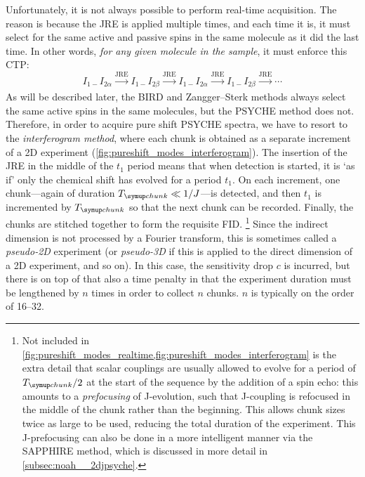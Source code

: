Unfortunately, it is not always possible to perform real-time acquisition.
The reason is because the JRE is applied multiple times, and each time it is, it must select for the same active and passive spins in the same molecule as it did the last time.
In other words, \textit{for any given molecule in the sample}, it must enforce this CTP:
\begin{equation}
    \label{eq:real_time_pureshift}
    I_{1-}I_{2\alpha} \xrightarrow[]{\text{JRE}} I_{1-}I_{2\beta} \xrightarrow[]{\text{JRE}} I_{1-}I_{2\alpha} \xrightarrow[]{\text{JRE}} I_{1-}I_{2\beta} \xrightarrow[]{\text{JRE}} \cdots
\end{equation}
As will be described later, the BIRD and Zangger--Sterk methods always select the same active spins in the same molecules, but the PSYCHE method does not.
Therefore, in order to acquire pure shift PSYCHE spectra, we have to resort to the \textit{interferogram method}, where each chunk is obtained as a separate increment of a 2D experiment (\cref{fig:pureshift_modes_interferogram}).
The insertion of the JRE in the middle of the $t_1$ period means that when detection is started, it is `as if' only the chemical shift has evolved for a period $t_1$.
On each increment, one chunk---again of duration $\Tchunk \ll 1/J$---is detected, and then $t_1$ is incremented by $\Tchunk$ so that the next chunk can be recorded.
Finally, the chunks are stitched together to form the requisite FID.%
\footnote{Not included in \cref{fig:pureshift_modes_realtime,fig:pureshift_modes_interferogram} is the extra detail that scalar couplings are usually allowed to evolve for a period of $\Tchunk/2$ at the start of the sequence by the addition of a spin echo: this amounts to a \textit{prefocusing} of J-evolution, such that J-coupling is refocused in the middle of the chunk rather than the beginning\autocite{Aguilar2010ACIE}.
This allows chunk sizes twice as large to be used, reducing the total duration of the experiment.
This J-prefocusing can also be done in a more intelligent manner via the SAPPHIRE method\autocite{Moutzouri2017CC}, which is discussed in more detail in \cref{subsec:noah__2djpsyche}.}
Since the indirect dimension is not processed by a Fourier transform, this is sometimes called a \textit{pseudo-2D} experiment (or \textit{pseudo-3D} if this is applied to the direct dimension of a 2D experiment, and so on).
In this case, the sensitivity drop $c$ is incurred, but there is on top of that also a time penalty in that the experiment duration must be lengthened by $n$ times in order to collect $n$ chunks.
$n$ is typically on the order of 16--32.
